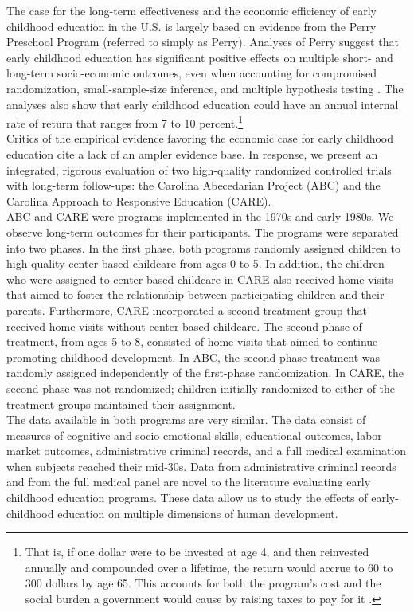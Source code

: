 \noindent  The case for the long-term effectiveness and the economic efficiency of early childhood education in the U.S. is largely based on evidence from the Perry Preschool Program (referred to simply as Perry). Analyses of Perry suggest that early childhood education has significant positive effects on multiple short- and long-term socio-economic outcomes, even when accounting for compromised randomization, small-sample-size inference, and multiple hypothesis testing \citep{Heckman_Moon_etal_2010_QE}. The analyses also show that early childhood education could have an annual internal rate of return that ranges from 7 to 10 percent.\footnote{That is, if one dollar were to be invested at age 4, and then reinvested annually and compounded over a lifetime, the return would accrue to 60 to 300 dollars by age 65. This accounts for both the program's cost and the social burden a government would cause by raising taxes to pay for it \citep{Heckman_Moon_etal_2010_RateofReturn}.}\\

\noindent Critics of the empirical evidence favoring the economic case for early childhood education cite a lack of an ampler evidence base. In response, we present an integrated, rigorous evaluation of two high-quality randomized controlled trials with long-term follow-ups: the Carolina Abecedarian Project (ABC) and the Carolina Approach to Responsive Education (CARE).\\ 

\noindent ABC and CARE were programs implemented in the 1970s and early 1980s. We observe long-term outcomes for their participants. The programs were separated into two phases. In the first phase, both programs randomly assigned children to high-quality center-based childcare from ages 0 to 5. In addition, the children who were assigned to center-based childcare in CARE also received home visits that aimed to foster the relationship between participating children and their parents. Furthermore, CARE incorporated a second treatment group that received home visits without center-based childcare. The second phase of treatment, from ages 5 to 8, consisted of home visits that aimed to continue promoting childhood development. In ABC, the second-phase treatment was randomly assigned independently of the first-phase randomization. In CARE, the second-phase was not randomized; children initially randomized to either of the treatment groups maintained their assignment.\\

\noindent The data available in both programs are very similar. The data consist of measures of cognitive and socio-emotional skills, educational outcomes, labor market outcomes, administrative criminal records, and a full medical examination when subjects reached their mid-30s. Data from administrative criminal records and from the full medical panel are novel to the literature evaluating early childhood education programs. These data allow us to study the effects of early-childhood education on multiple dimensions of human development.\\

